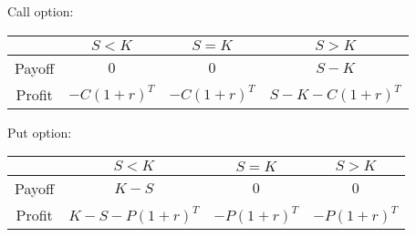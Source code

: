 \documentclass[10pt,landscape]{article}
\begin{document}
\begin{multicols}{4}
Call option:
\begin{tabular}{c|c|c|c}
    & $S < K$ & $S = K$ & $S > K$ \\
    \hline
    Payoff & $0$ & $0$ & $S - K$ \\
    Profit & $-C (1+r)^T$ & $-C (1+r)^T$ & $S - K - C (1+r)^T$ \\
\end{tabular}

Put option:
\begin{tabular}{c|c|c|c}
    & $S < K$ & $S = K$ & $S > K$ \\
    \hline
    Payoff & $K - S$ & $0$ & $0$ \\
    Profit & $K - S - P(1+r)^T$ & $- P(1+r)^T$ & $- P(1+r)^T$ \\
\end{tabular}

\end{multicols}
\end{document}
